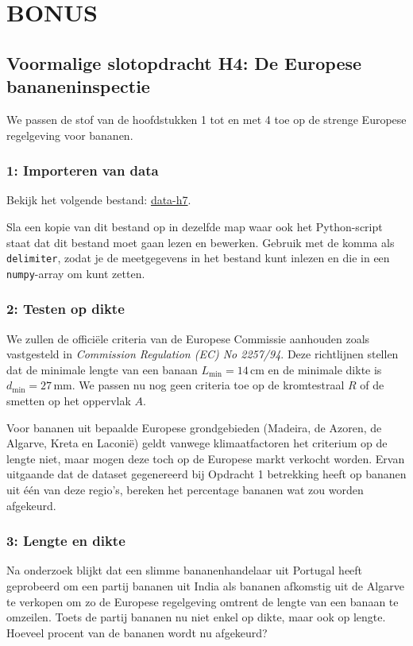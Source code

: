 \documentclass[a4paper,11pt, fleqn]{article}
\newcommand{\ditwc}{Naam van het huidige werkcollege}
\begin{document}
\clearpage
\renewcommand{\ditwc}{BONUS}
\section{BONUS}
\subsection{Voormalige slotopdracht H4: De Europese bananeninspectie}
We passen de stof van de hoofdstukken 1 tot en met 4 toe op de strenge Europese regelgeving voor bananen.

\subsubsection*{1: Importeren van data}
Bekijk het volgende bestand: 
\href{https://github.com/Ichthus-College-IN/Python-x-Meet-je-leefomgeving/tree/main/inc/data_h7.txt}{data-h7}.

Sla een kopie van dit bestand op in dezelfde map waar ook het Python-script staat dat dit bestand moet gaan lezen en bewerken.
Gebruik  met de komma als \verb,delimiter,, zodat je de meetgegevens in het bestand kunt inlezen en die in een \verb,numpy,-array om kunt zetten.

\subsubsection*{2: Testen op dikte}
We zullen de offici\"ele criteria van de Europese Commissie aanhouden zoals vastgesteld in \emph{Commission Regulation (EC) No 2257/94}. Deze richtlijnen stellen dat de minimale lengte van een banaan $L_\textrm{min} = 14\,\textrm{cm}$ en de minimale dikte is $d_\textrm{min} = 27\,\textrm{mm}$. We passen nu nog geen criteria toe op de kromtestraal $R$ of de smetten op het oppervlak $A$.

Voor bananen uit bepaalde Europese grondgebieden (Madeira, de Azoren, de Algarve, Kreta en Laconi\"e) geldt vanwege klimaatfactoren het criterium op de lengte niet, maar mogen deze toch op de Europese markt verkocht worden. Ervan uitgaande dat de dataset gegenereerd bij Opdracht 1 betrekking heeft op bananen uit \'e\'en van deze regio's, bereken het percentage bananen wat zou worden afgekeurd.

\subsubsection*{3: Lengte en dikte}
Na onderzoek blijkt dat een slimme bananenhandelaar uit Portugal heeft geprobeerd om een partij bananen uit India als bananen afkomstig uit de Algarve te verkopen om zo de Europese regelgeving omtrent de lengte van een banaan te omzeilen. Toets de partij bananen nu niet enkel op dikte, maar ook op lengte. Hoeveel procent van de bananen wordt nu afgekeurd?
\end{document}
